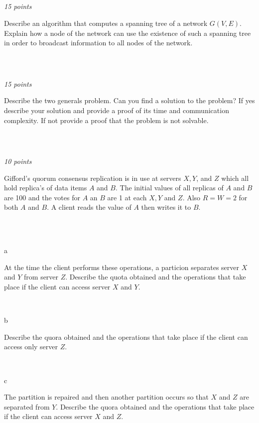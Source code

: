 \documentclass[a4paper]{article}
\newcommand{\points}[1]{\subsection{} \textit{#1 points}\\}
\newcommand{\question}[2][]{
  \noindent
  \parbox[t]{\textwidth}{#1 \parbox[t]{0.95\textwidth}{#2}}\\
}
\begin{document}
\points{15}
\question{Describe an algorithm that computes a spanning tree of a network $G(V,E)$. Explain how a node of the network can use the existence of such a spanning tree in order to broadcast information to all nodes of the network.}

\points{15}
\question{Describe the two generals problem. Can you find a solution to the problem? If yes describe your solution and provide a proof of its time and communication complexity. If not provide a proof that the problem is not solvable. }

\points{10}
\question{Gifford's quorum consensus replication is in use at servers $X, Y$, and $Z$ which all hold replica's of data items $A$ and $B$. The initial values of all replicas of $A$ and $B$ are 100 and the votes for $A$ an $B$ are 1 at each $X, Y$ and $Z$. Also $R=W=2$ for both $A$ and $B$. A client reads the value of $A$ then writes it to $B$.}\\
\question[a]{At the time the client performs these operations, a particion separates server $X$ and $Y$ from server $Z$. Describe the quota obtained and the operations that take place if the client can access server $X$ and $Y$.}
\question[b]{Describe the quora obtained and the operations that take place if the client can access only server $Z$.}
\question[c]{The partition is repaired and then another partition occurs so that $X$ and $Z$ are separated from $Y$. Describe the quora obtained and the operations that take place if the client can access server $X$ and $Z$.}
\end{document}
